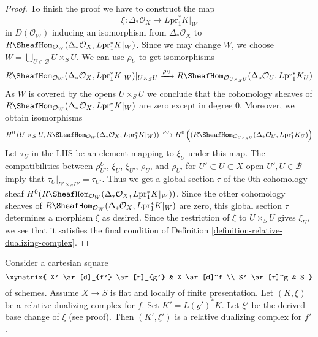\begin{proof}
\medskip\noindent
To finish the proof we have to construct the map
$$
\xi : \Delta_*\mathcal{O}_X \longrightarrow L\text{pr}_1^*K|_W
$$
in $D(\mathcal{O}_W)$ inducing an isomorphism from $\Delta_*\mathcal{O}_X$ to
$R\SheafHom_{\mathcal{O}_W}(\Delta_*\mathcal{O}_X, L\text{pr}_1^*K|_W)$.
Since we may change $W$, we choose
$W = \bigcup_{U \in \mathcal{B}} U \times_S U$.
We can use $\rho_U$ to get isomorphisms
$$
R\SheafHom_{\mathcal{O}_W}(
\Delta_*\mathcal{O}_X, L\text{pr}_1^*K|_W)|_{U \times_S U}
\xrightarrow{\rho_U}
R\SheafHom_{\mathcal{O}_{U \times_S U}}(
\Delta_*\mathcal{O}_U, L\text{pr}_1^*K_U)
$$
As $W$ is covered by the opens $U \times_S U$
we conclude that the cohomology sheaves of
$R\SheafHom_{\mathcal{O}_W}(\Delta_*\mathcal{O}_X, L\text{pr}_1^*K|_W)$
are zero except in degree $0$. Moreover, we obtain isomorphisms
$$
H^0\left(U \times_S U, R\SheafHom_{\mathcal{O}_W}(\Delta_*\mathcal{O}_X,
L\text{pr}_1^*K|_W)\right)
\xrightarrow{\rho_U}
H^0\left((R\SheafHom_{\mathcal{O}_{U \times_S U}}(
\Delta_*\mathcal{O}_U, L\text{pr}_1^*K_U)\right)
$$
Let $\tau_U$ in the LHS be an element mapping to $\xi_U$ under this map.
The compatibilities between
$\rho^U_{U'}$, $\xi_U$, $\xi_{U'}$, $\rho_U$, and $\rho_{U'}$
for $U' \subset U \subset X$ open $U', U \in \mathcal{B}$
imply that $\tau_U|_{U' \times_S U'} = \tau_{U'}$.
Thus we get a global section $\tau$ of the $0$th cohomology sheaf
$H^0(R\SheafHom_{\mathcal{O}_W}(\Delta_*\mathcal{O}_X, L\text{pr}_1^*K|_W))$.
Since the other cohomology sheaves of
$R\SheafHom_{\mathcal{O}_W}(\Delta_*\mathcal{O}_X, L\text{pr}_1^*K|_W)$
are zero, this global section $\tau$
determines a morphism $\xi$ as desired. Since the restriction
of $\xi$ to $U \times_S U$ gives $\xi_U$, we see that it
satisfies the final condition of
Definition \ref{definition-relative-dualizing-complex}.
\end{proof}

\begin{lemma}
\label{lemma-base-change-relative-dualizing}
Consider a cartesian square
$$
\xymatrix{
X' \ar[d]_{f'} \ar[r]_{g'} & X \ar[d]^f \\
S' \ar[r]^g & S
}
$$
of schemes. Assume $X \to S$ is flat and locally of finite presentation.
Let $(K, \xi)$ be a relative dualizing complex for $f$.
Set $K' = L(g')^*K$. Let $\xi'$ be the derived base change of $\xi$
(see proof). Then $(K', \xi')$ is a relative dualizing complex for $f'$.
\end{lemma}


